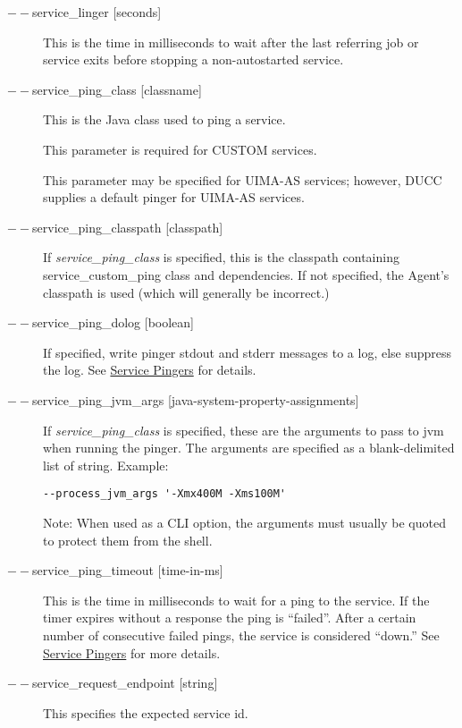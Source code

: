 \begin{description}
      \item[$--$service\_linger {[seconds]}] This is the time in milliseconds to wait after the last
        referring job or service exits before stopping a non-autostarted service.

      \item[$--$service\_ping\_class {[classname]}] This is the Java class used to ping a service. 

        This parameter is required for CUSTOM services.

        This parameter may be specified for UIMA-AS services; however, DUCC supplies a default
        pinger for UIMA-AS services.

      \item[$--$service\_ping\_classpath {[classpath]}] If {\em service\_ping\_class} is specified,
        this is the classpath containing service\_custom\_ping class and dependencies.  If not
        specified, the Agent's classpath is used (which will generally be incorrect.)

      \item[$--$service\_ping\_dolog {[boolean]}] If specified, write pinger stdout and stderr
        messages to a log, else suppress the log. See \hyperref[sec:service.pingers]{Service Pingers}
        for details.

      \item[$--$service\_ping\_jvm\_args {[java-system-property-assignments]}] If 
        {\em service\_ping\_class} is specified, these are the arguments 
        to pass to jvm when running the pinger. The arguments are specified as a blank-delimited
        list of string.  Example:
\begin{verbatim}
--process_jvm_args '-Xmx400M -Xms100M' 
\end{verbatim}
        
        Note: When used as a CLI option, the arguments must usually be
        quoted to protect them from the shell.

      \item[$--$service\_ping\_timeout {[time-in-ms]}] This is the time in milliseconds to wait for a
        ping to the service.  If the timer expires without a response the ping is ``failed''. After
        a certain number of consecutive failed pings, the service is considered ``down.''  See
        \hyperref[sec:service.pingers]{Service Pingers} for more details.

      \item[$--$service\_request\_endpoint {[string]}] This specifies the expected service id.  


\end{description}
